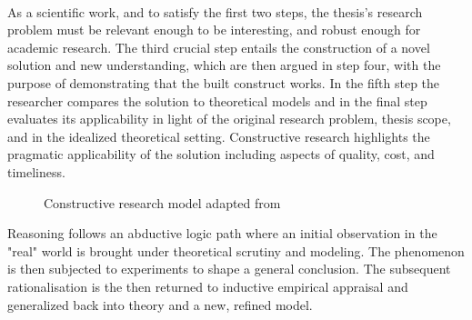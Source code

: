 \documentclass[12pt,a4paper,oneside,pdftex]{report}
\begin{document}
\\[2.00cm]

As a scientific work, and to satisfy the first two steps, the thesis's research problem must be relevant enough to be interesting, and robust enough for academic research. The third crucial step entails the construction of a novel solution and new understanding, which are then argued in step four, with the purpose of demonstrating that the built construct works. In the fifth step the researcher compares the solution to theoretical models and in the final step evaluates its applicability in light of the original research problem, thesis scope, and in the idealized theoretical setting. Constructive research highlights the pragmatic applicability of the solution including aspects of quality, cost, and timeliness.

\begin{figure}[H]
\centering
\caption{Constructive research model adapted from \citet{kasanen1993constructive}} \label{fig:constructive}
\end{figure}

Reasoning follows an abductive logic path where an initial observation in the "real" world is brought under theoretical scrutiny and modeling. The phenomenon is then subjected to experiments to shape a general conclusion. \citep{josephson1996abductive} The subsequent rationalisation is the then returned to inductive empirical appraisal and generalized back into theory and a new, refined model. 
\end{document}
